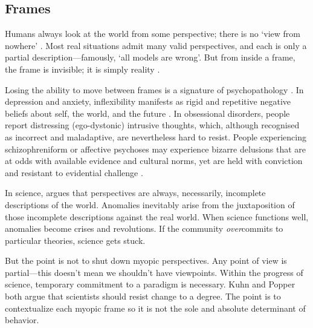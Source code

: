 \documentclass[11pt]{article}
\begin{document}




\subsection{Frames} 

Humans always look at the world from some perspective; there is no `view from nowhere' \citep{nagel1986view}. Most real situations admit many valid perspectives, and each is only a partial description---famously, `all models are wrong'. But from inside a frame, the frame is invisible; it is simply reality \citep{goffman1974frame, berger1966social, kuhn1970structure, wittgenstein1953philosophical}. 

Losing the ability to move between frames is a signature of psychopathology \citep{kashdan2010psychological}. In depression and anxiety, inflexibility manifests as rigid and repetitive negative beliefs about self, the world, and the future \citep{beck2011cognitive}. In obsessional disorders, people report distressing (ego-dystonic) intrusive thoughts, which, although recognised as incorrect and maladaptive, are nevertheless hard to resist. People experiencing schizophreniform or affective psychoses may experience bizarre delusions that are at odds with available evidence and cultural norms, yet are held with conviction and resistant to evidential challenge \citep{adams2013computational}. 

In science, \cite{kuhn1970structure} argues that perspectives are always, necessarily, incomplete descriptions of the world. Anomalies inevitably arise from the juxtaposition of those incomplete descriptions against the real world. When science functions well, anomalies become crises and revolutions. If the community \textit{over}commits to particular theories, science gets stuck.

But the point is not to shut down myopic perspectives. Any point of view is partial---this doesn't mean we shouldn't have viewpoints. Within the progress of science, temporary commitment to a paradigm is necessary. Kuhn and Popper \citep{popper1975rationality} both argue that scientists should resist change to a degree.  The point is to contextualize each myopic frame so it is not the sole and absolute determinant of behavior. 
\end{document}
